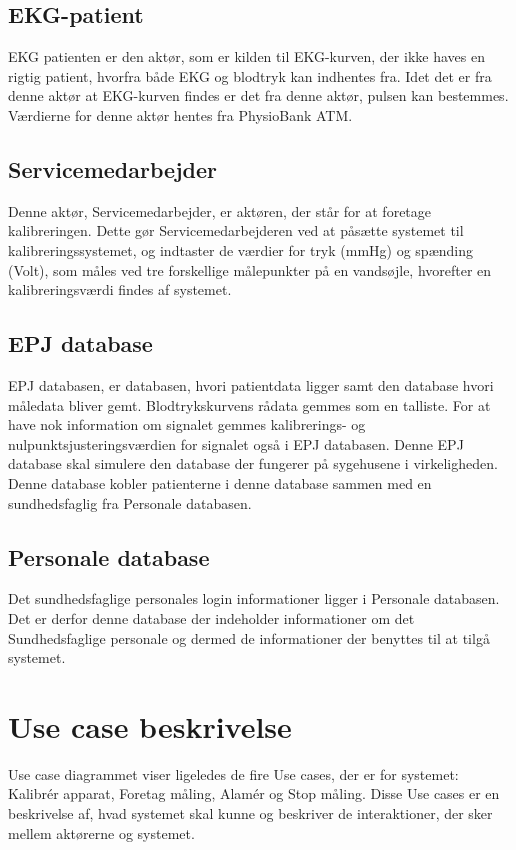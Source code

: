 \subsection{EKG-patient}
EKG patienten er den aktør, som er kilden til EKG-kurven, der ikke haves en rigtig patient, hvorfra både EKG og blodtryk kan indhentes fra. Idet det er fra denne aktør at EKG-kurven findes er det fra denne aktør, pulsen kan bestemmes.\\
Værdierne for denne aktør hentes fra PhysioBank ATM.
\subsection{Servicemedarbejder}
Denne aktør, Servicemedarbejder, er aktøren, der står for at foretage kalibreringen. Dette gør Servicemedarbejderen ved at påsætte systemet til kalibreringssystemet, og indtaster de værdier for tryk (mmHg) og spænding (Volt), som måles ved tre forskellige målepunkter på en vandsøjle, hvorefter en kalibreringsværdi findes af systemet.
\subsection{EPJ database}
EPJ databasen, er databasen, hvori patientdata ligger samt den database hvori måledata bliver gemt. Blodtrykskurvens rådata gemmes som en talliste. For at have nok information om signalet gemmes kalibrerings- og nulpunktsjusteringsværdien for signalet også i EPJ databasen. Denne EPJ database skal simulere den database der fungerer på sygehusene i virkeligheden. Denne database kobler patienterne i denne database sammen med en sundhedsfaglig fra Personale databasen. 
\subsection{Personale database}
Det sundhedsfaglige personales login informationer ligger i Personale databasen. Det er derfor denne database der indeholder informationer om det Sundhedsfaglige personale og dermed de informationer der benyttes til at tilgå systemet.
\section{Use case beskrivelse}
Use case diagrammet viser ligeledes de fire Use cases, der er for systemet: Kalibrér apparat, Foretag måling, Alamér og Stop måling. Disse Use cases er en beskrivelse af, hvad systemet skal kunne og beskriver de interaktioner, der sker mellem aktørerne og systemet.
\\
